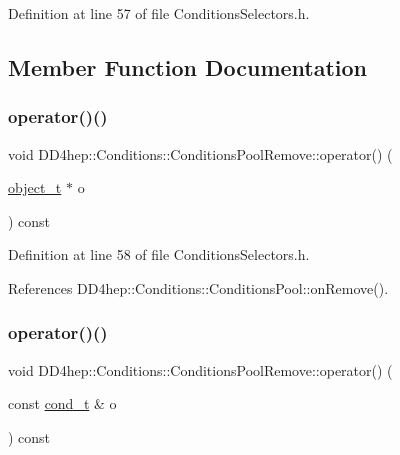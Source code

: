 Definition at line 57 of file Conditions\+Selectors.\+h.



\subsection{Member Function Documentation}
\hypertarget{class_d_d4hep_1_1_conditions_1_1_conditions_pool_remove_ae331d31a1823e19896efd06f81cd84b5}{}\label{class_d_d4hep_1_1_conditions_1_1_conditions_pool_remove_ae331d31a1823e19896efd06f81cd84b5} 
\subsubsection{\texorpdfstring{operator()()}{operator()()}\hspace{0.1cm}{\footnotesize\ttfamily [1/4]}}
{\footnotesize\ttfamily void D\+D4hep\+::\+Conditions\+::\+Conditions\+Pool\+Remove\+::operator() (\begin{DoxyParamCaption}\item[{\hyperlink{class_d_d4hep_1_1_conditions_1_1_cond_____oper_a4229491e49bfd21058dff10125a73f63}{object\+\_\+t} $\ast$}]{o }\end{DoxyParamCaption}) const\hspace{0.3cm}{\ttfamily [inline]}}



Definition at line 58 of file Conditions\+Selectors.\+h.



References D\+D4hep\+::\+Conditions\+::\+Conditions\+Pool\+::on\+Remove().

\hypertarget{class_d_d4hep_1_1_conditions_1_1_conditions_pool_remove_aeeb1b39a52afd76a37913c7868e2a90d}{}\label{class_d_d4hep_1_1_conditions_1_1_conditions_pool_remove_aeeb1b39a52afd76a37913c7868e2a90d} 
\subsubsection{\texorpdfstring{operator()()}{operator()()}\hspace{0.1cm}{\footnotesize\ttfamily [2/4]}}
{\footnotesize\ttfamily void D\+D4hep\+::\+Conditions\+::\+Conditions\+Pool\+Remove\+::operator() (\begin{DoxyParamCaption}\item[{const \hyperlink{class_d_d4hep_1_1_conditions_1_1_cond_____oper_aceca9f6a0e8c84364946eace47275d09}{cond\+\_\+t} \&}]{o }\end{DoxyParamCaption}) const\hspace{0.3cm}{\ttfamily [inline]}}



